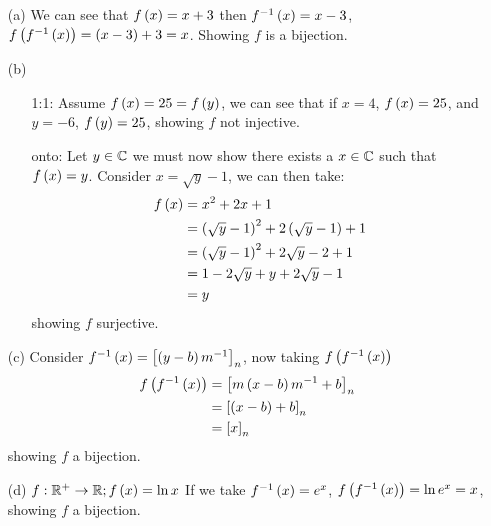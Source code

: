 \begin{mdframed}[style=darkAnswer,frametitle={Joe Starr}]
  \begin{itemize}
    \item [(a)]{ We can see that $f\left(x\right)=x+3$ then $f^{-1}\left(x\right)=x-3$, 
    $f\left(f^{-1}\left(x\right)\right)=\left(x-3\right)+3=x$. Showing $f$ is a bijection.
    }
    \item [(b)]{
      \begin{itemize}
        \item[1:1:]{\hspace{.5in}\newline
          Assume $f\left(x\right)=25=f\left(y\right)$, we can see that if $x=4$, $f\left(x\right)=25$, 
          and $y=-6$, $f\left(y\right)=25$, showing $f$ not injective. 
        }
        \item[onto:]{\hspace{.5in}\newline
          Let $y\in \mathbb{C}$ we must now show there exists a $x \in \mathbb{C}$ such that
          $f\left(x\right)=y$. Consider $x=\sqrt{y}-1$, we can then take:
          \begin{align*}
            f\left(x\right) &= x^2+2x+1\\
            &= \left(\sqrt{y}-1\right)^2+2\left(\sqrt{y}-1\right)+1\\
            &= \left(\sqrt{y}-1\right)^2+2\sqrt{y}-2+1\\
            &= 1 - 2 \sqrt{y} + y+2\sqrt{y}-1\\
            &=  y\\
          \end{align*}
          showing $f$ surjective.  
        }
      \end{itemize}
    }
    \item [(c)]{
    Consider $f^{-1}\left(x\right)=\left[\left(y-b\right)m^{-1}\right]_n$, now taking 
    $f\left(f^{-1}\left(x\right)\right)$
    \begin{align*}
      f\left(f^{-1}\left(x\right)\right) &= \left[m\left(x-b\right)m^{-1}+b\right]_n\\
      &= \left[\left(x-b\right)+b\right]_n\\
      &= \left[x\right]_n\\
    \end{align*}
    showing $f$ a bijection.
    }
    \item [(d)]{
      $f:\mathbb{R}^+\to \mathbb{R}; f\left(x\right)=\ln x$
      If we take $f^{-1}\left(x\right)=e^x$, $f\left(f^{-1}\left(x\right)\right)=\ln e^x = x$, showing $f$
      a bijection. 
    }
  \end{itemize}
\end{mdframed}
